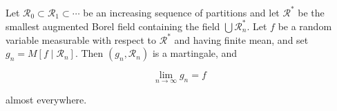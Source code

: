 Let $\mathcal{R}_0 \subset \mathcal{R}_1 \subset \cdots$ be an increasing sequence of partitions and let $\mathcal{R}^*$ be the smallest augmented Borel field containing the field $\bigcup \mathcal{R}_n^*$. Let $f$ be a random variable measurable with respect to $\mathcal{R}^*$ and having finite mean, and set $g_n = M[f \mid \mathcal{R}_n]$. Then $(g_n, \mathcal{R}_n)$ is a martingale, and

$$\lim_{n \to \infty} g_n = f$$

almost everywhere.
